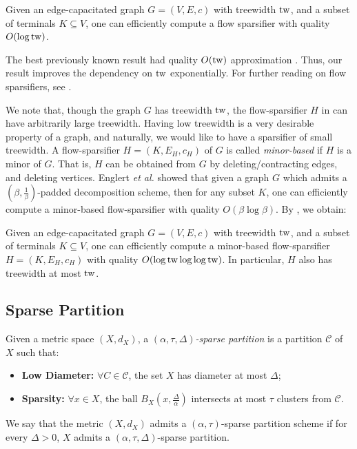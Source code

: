 \documentclass{theoretics}
\newcommand{\tw}{{\rm tw}}
\newcommand{\etal}{{\em et al. \xspace}}
\def\cC{\ensuremath{\mathcal{C}}}
\begin{document}
\begin{corollary}\label{cor:flowSpar}
	Given an edge-capacitated graph $G = (V,E,c)$ with treewidth $\tw$, and a subset of terminals $K\subseteq V$, one can efficiently compute a flow sparsifier with quality $O(\log\tw)$. 
\end{corollary}

The best previously known result had quality $O(\tw)$ approximation \cite{EGKRTT14,AGGNT19}. Thus, our result improves the dependency on $\tw$ exponentially.  For further reading on flow sparsifiers, see \cite{Moitra09,MT10,MM10,CLLM10,Chuzhoy12,AGK14}.

We note that, though the graph $G$ has treewidth $\tw$, the flow-sparsifier $H$ in  can have arbitrarily large treewidth. Having low treewidth is a very desirable property of a graph, and naturally, we would like to have a sparsifier of small treewidth. A flow-sparsifier  $H = (K,E_H,  c_H)$ of $G$ is called \emph{minor-based} if $H$ is a minor of $G$. That is, $H$ can be obtained from $G$ by deleting/contracting edges, and deleting vertices. Englert \etal \cite{EGKRTT14} showed that given a graph $G$ which admits a $(\beta,\frac1\beta)$-padded decomposition scheme, then for any subset $K$, one can efficiently compute a minor-based flow-sparsifier with
quality $O(\beta\log\beta)$. By , we obtain:

\begin{corollary}\label{cor:flowSparMinorBased}
	Given an edge-capacitated graph $G = (V,E,c)$ with treewidth $\tw$, and a subset of terminals $K\subseteq V$, one can efficiently compute a minor-based flow-sparsifier  $H = (K,E_H, c_H)$ with quality $O(\log\tw\log\log\tw)$. In particular, $H$ also has treewidth at most $\tw$.
\end{corollary}

\subsection{Sparse Partition}

Given a metric space $(X,d_X)$,
a \emph{$(\alpha, \tau,\Delta)$-sparse partition} is a partition $\cC$ of $X$ such that:
\begin{itemize}
	\item \textbf{Low Diameter:} $\forall C\in\cC$, the set $X$ has diameter at most $\Delta$;
	\item \textbf{Sparsity:} $\forall x \in X$, the ball $B_X(x, \frac{\Delta}{\alpha})$ intersects at most $\tau$ clusters from $\cC$.
\end{itemize}
We say that the metric $(X,d_X)$ admits a $(\alpha, \tau)$-sparse partition scheme if for every $\Delta>0$, $X$ admits a $(\alpha, \tau,\Delta)$-sparse partition.
\end{document}
